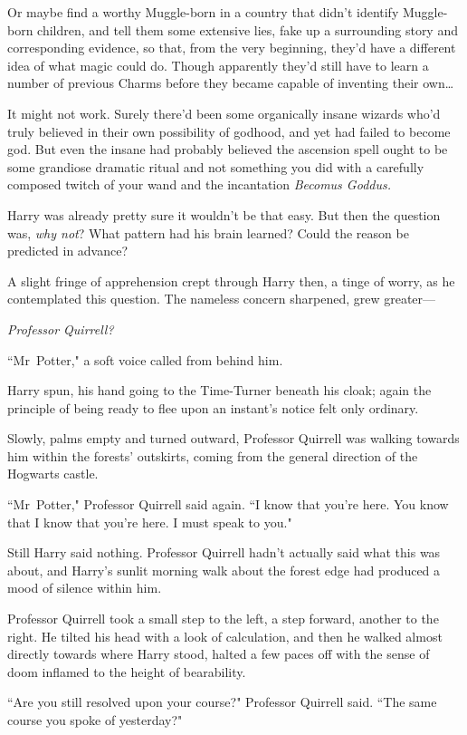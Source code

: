 Or maybe find a worthy Muggle-born in a country that didn't identify Muggle-born children, and tell them some extensive lies, fake up a surrounding story and corresponding evidence, so that, from the very beginning, they'd have a different idea of what magic could do. Though apparently they'd still have to learn a number of previous Charms before they became capable of inventing their own{\ldots}

It might not work. Surely there'd been some organically insane wizards who'd truly believed in their own possibility of godhood, and yet had failed to become god. But even the insane had probably believed the ascension spell ought to be some grandiose dramatic ritual and not something you did with a carefully composed twitch of your wand and the incantation \emph{Becomus Goddus.}

Harry was already pretty sure it wouldn't be that easy. But then the question was, \emph{why not}? What pattern had his brain learned? Could the reason be predicted in advance?

A slight fringe of apprehension crept through Harry then, a tinge of worry, as he contemplated this question. The nameless concern sharpened, grew greater—

\emph{Professor Quirrell?}

``Mr~Potter," a soft voice called from behind him.

Harry spun, his hand going to the Time-Turner beneath his cloak; again the principle of being ready to flee upon an instant's notice felt only ordinary.

Slowly, palms empty and turned outward, Professor Quirrell was walking towards him within the forests' outskirts, coming from the general direction of the Hogwarts castle.

``Mr~Potter," Professor Quirrell said again. ``I know that you're here. You know that I know that you're here. I must speak to you."

Still Harry said nothing. Professor Quirrell hadn't actually said what this was about, and Harry's sunlit morning walk about the forest edge had produced a mood of silence within him.

Professor Quirrell took a small step to the left, a step forward, another to the right. He tilted his head with a look of calculation, and then he walked almost directly towards where Harry stood, halted a few paces off with the sense of doom inflamed to the height of bearability.

``Are you still resolved upon your course?" Professor Quirrell said. ``The same course you spoke of yesterday?"

